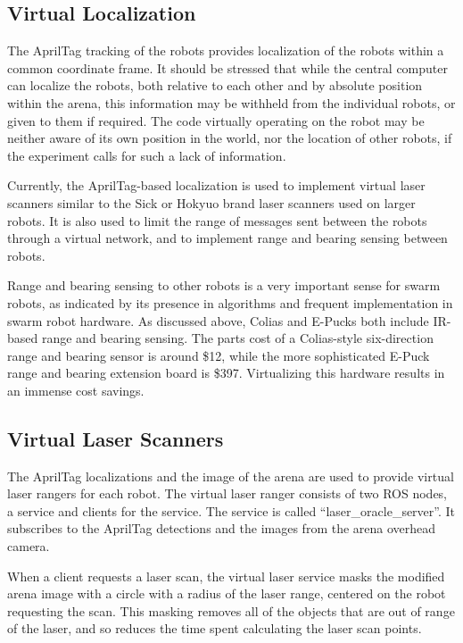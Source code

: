 \subsection{Virtual Localization} \label{section:Virtual_Localization}

The AprilTag tracking of the robots provides localization of the robots within a common coordinate frame. 
It should be stressed that while the central computer can localize the robots, both relative to each other and by absolute position within the arena, this information may be withheld from the individual robots, or given to them if required. 
The code virtually operating on the robot may be neither aware of its own position in the world, nor the location of other robots, if the experiment calls for such a lack of information. 

Currently, the AprilTag-based localization is used to implement virtual laser scanners similar to the Sick or Hokyuo brand laser scanners used on larger robots. 
It is also used to limit the range of messages sent between the robots through a virtual network, and to implement range and bearing sensing between robots. 

Range and bearing sensing to other robots is a very important sense for swarm robots, as indicated by its presence in algorithms and frequent implementation in swarm robot hardware. 
As discussed above, Colias and E-Pucks both include IR-based range and bearing sensing. 
The parts cost of a Colias-style six-direction range and bearing sensor is around \$12, while the more sophisticated E-Puck range and bearing extension board is \$397. 
Virtualizing this hardware results in an immense cost savings. 

\subsection{Virtual Laser Scanners} \label{section:Virtual_Laser_Scanners}

The AprilTag localizations and the image of the arena are used to provide virtual laser rangers for each robot. 
The virtual laser ranger consists of two ROS nodes, a service and clients for the service. 
The service is called ``laser\_oracle\_server''. 
It subscribes to the AprilTag detections and the images from the arena overhead camera. 
 
When a client requests a laser scan, the virtual laser service masks the modified arena image with a circle with a radius of the laser range, centered on the robot requesting the scan.
This masking removes all of the objects that are out of range of the laser, and so reduces the time spent calculating the laser scan points. 

